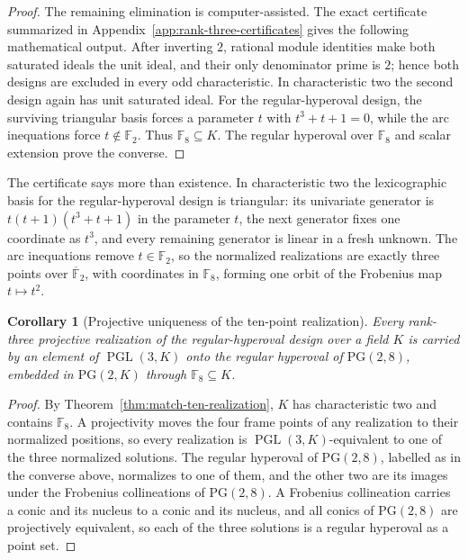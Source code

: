 \documentclass[11pt]{article}
\newtheorem{corollary}[theorem]{Corollary}
\theoremstyle{definition}
\theoremstyle{remark}
\newcommand{\PG}{\mathrm{PG}}
\newcommand{\F}{\mathbb{F}}
\begin{document}
\begin{proof}
The remaining elimination is computer-assisted.  The exact certificate
summarized in Appendix~\ref{app:rank-three-certificates} gives the following
mathematical output.  After inverting \(2\), rational module identities make
both saturated ideals the unit ideal, and their only denominator prime is
\(2\); hence both designs are excluded in every odd characteristic.  In
characteristic two the second design again has unit saturated ideal.  For
the regular-hyperoval design, the surviving triangular basis forces a
parameter \(t\) with \(t^3+t+1=0\), while the arc inequations force
\(t\notin\F_2\).  Thus \(\F_8\subseteq K\).  The regular hyperoval over
\(\F_8\) and scalar extension prove the converse.
\end{proof}

The certificate says more than existence.  In characteristic two the
lexicographic basis for the regular-hyperoval design is triangular: its
univariate generator is \(t(t+1)(t^3+t+1)\) in the parameter \(t\), the
next generator fixes one coordinate as \(t^3\), and every remaining
generator is linear in a fresh unknown.  The arc inequations remove
\(t\in\F_2\), so the normalized realizations are exactly three points over
\(\overline{\F}_2\), with coordinates in \(\F_8\), forming one orbit of the
Frobenius map \(t\mapsto t^2\).

\begin{corollary}[Projective uniqueness of the ten-point realization]
\label{cor:ten-point-uniqueness}
Every rank-three projective realization of the regular-hyperoval design over
a field \(K\) is carried by an element of \(\operatorname{PGL}(3,K)\) onto
the regular hyperoval of \(\PG(2,8)\), embedded in \(\PG(2,K)\) through
\(\F_8\subseteq K\).
\end{corollary}

\begin{proof}
By Theorem~\ref{thm:match-ten-realization}, \(K\) has characteristic two
and contains \(\F_8\).  A projectivity moves the four frame points of any
realization to their normalized positions, so every realization is
\(\operatorname{PGL}(3,K)\)-equivalent to one of the three normalized
solutions.  The regular hyperoval of \(\PG(2,8)\), labelled as in the
converse above, normalizes to one of them, and the other two are its
images under the Frobenius collineations of \(\PG(2,8)\).  A Frobenius
collineation carries a conic and its nucleus to a conic and its nucleus,
and all conics of \(\PG(2,8)\) are projectively equivalent, so each of the
three solutions is a regular hyperoval as a point set.
\end{proof}
\end{document}

